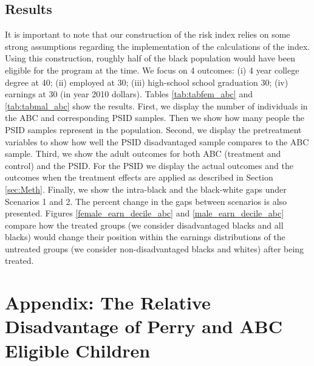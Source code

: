 \subsection{Results}
It is important to note that our construction of the risk index relies on some strong assumptions regarding the implementation of the calculations of the index. Using this construction, roughly half of the black population would have been eligible for the program at the time. We focus on 4 outcomes: (i) 4 year college degree at 40; (ii) employed at 30; (iii) high-school school graduation 30; (iv) earnings at 30 (in year 2010 dollars). Tables \ref{tab:tabfem_abc} and \ref{tab:tabmal_abc} show the results. First, we display the number of individuals in the ABC and corresponding PSID samples. Then we show how many people the PSID samples represent in the population. Second, we display the pretreatment variables to show how well the PSID disadvantaged sample compares to the ABC sample. Third, we show the adult outcomes for both ABC (treatment and control) and the PSID. For the PSID we display the actual outcomes and the outcomes when the treatment effects are applied as described in Section \ref{sec:Meth}. Finally, we show the intra-black and the black-white gaps under Scenarios 1 and 2. The percent change in the gaps between scenarios is also presented. Figures \ref{female_earn_decile_abc} and \ref{male_earn_decile_abc} compare how the treated groups (we consider disadvantaged blacks and all blacks) would  change their position within the earnings distributions of the untreated groups (we consider non-disadvantaged blacks and whites) after being treated.


\clearpage
{}


\restoregeometry


\restoregeometry

\medskip{}

\newpage
\section{Appendix: The Relative Disadvantage of Perry and ABC Eligible Children} \label{sec:comp}

